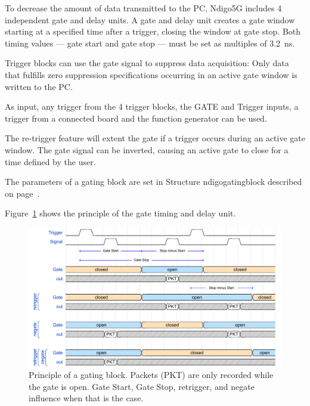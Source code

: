         To decrease the amount of data transmitted to the PC, Ndigo5G includes 4 independent gate and delay units. A gate and delay unit creates a gate window starting at a specified time after a trigger, closing the window at gate stop. Both timing values — gate start and gate stop — must be set as multiples of 3.2~ns.\par

        Trigger blocks can use the gate signal to suppress data acquisition: Only data that fulfills zero suppression specifications occurring in an active gate window is written to the PC.\par
        As input, any trigger from the 4 trigger blocks, the GATE and Trigger inputs, a trigger from a connected board and the function generator can be used.\par

        The re-trigger feature will extent the gate if a trigger occurs during an active gate window. The gate signal can be inverted, causing an active gate to close for a time defined by the user.\par

        The parameters of a gating block are set in Structure \textsf{ndigo\tu gating\tu block} described on page~\pageref{cp:gatingblock}.\par

        Figure~\ref{fig:GateUDelay} shows the principle of the gate timing and delay unit.

        \begin{figure}[ht]
            \begin{center}
                \includegraphics[width=1.0\textwidth]{figures/gating_principle.pdf}
                \caption{\label{fig:GateUDelay} Principle of a gating block. Packets (PKT) are only recorded while the gate is open. Gate Start, Gate Stop, retrigger, and negate influence when that is the case.}
            \end{center}
        \end{figure}

